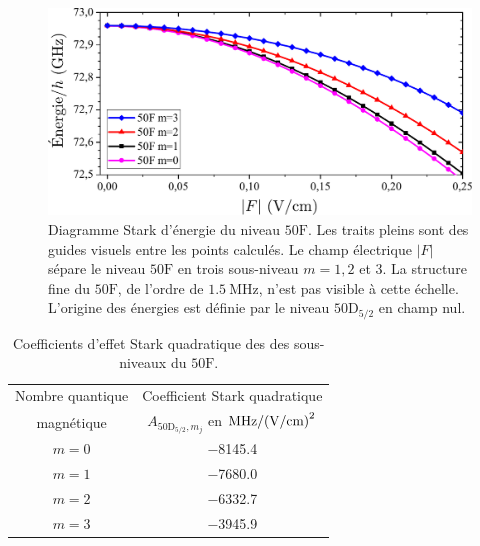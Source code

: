 \begin{figure}[!h]
\centering
\includegraphics[width=\linewidth]{figures/circulars/Stark50F}
\caption[Diagramme Stark d'énergie du niveau $\mathrm{50F}$]{
Diagramme Stark d'énergie du niveau $\mathrm{50F}$.
Les traits pleins sont des guides visuels entre les points calculés.
Le champ électrique $|F|$ sépare le niveau $\mathrm{50F}$ en trois sous-niveau $m=1,2$ et $3$.
La structure fine du $\mathrm{50F}$, de l'ordre de $\SI{1.5}{\MHz}$, n'est pas visible à cette échelle.
L'origine des énergies est définie par le niveau $\mathrm{50D}_{5/2}$ en champ nul.
}
\label{fig:Stark50F}
\end{figure}

\begin{table}[!h]
	\centering
	\caption[Effet Stark quadratique des sous-niveaux du $\mathrm{50F}$]{Coefficients d'effet Stark quadratique des des sous-niveaux du $\mathrm{50F}$.
	}
	\label{tab:Stark_50F}
	\begin{tabular}{c c }
		\toprule\midrule
		Nombre quantique
		& Coefficient Stark quadratique
		\\
		magnétique
		& $A_{\mathrm{50D}_{5/2},m_j}$ en $\si{\MHz \per (\V \per\cm) \squared}$ \\
		\midrule
		$m=0$
		& \SI{-8145.4}{} \\
		$m=1$
		& \SI{-7680.0}{} \\
		$m=2$
		& \SI{-6332.7}{} \\
		$m=3$
		& \SI{-3945.9}{} \\
		\midrule
		\bottomrule
 	\end{tabular}
\end{table}
%

